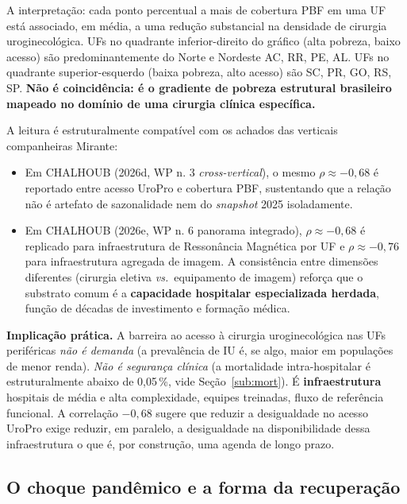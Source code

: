 \documentclass[12pt,a4paper,oneside]{article}
\begin{document}
A interpretação: cada ponto percentual a mais de cobertura PBF em
uma UF está associado, em média, a uma redução substancial na
densidade de cirurgia uroginecológica. UFs no quadrante inferior-direito
do gráfico (alta pobreza, baixo acesso) são predominantemente do
Norte e Nordeste \textemdash{} AC, RR, PE, AL. UFs no quadrante
superior-esquerdo (baixa pobreza, alto acesso) são SC, PR, GO, RS,
SP. \textbf{Não é coincidência: é o gradiente de pobreza estrutural
brasileiro mapeado no domínio de uma cirurgia clínica
específica.}

A leitura é estruturalmente compatível com os achados das verticais
companheiras Mirante:

\begin{itemize}
\item Em CHALHOUB (2026d, WP n. 3 \textendash{}
\textit{cross-vertical}), o mesmo $\rho \approx -0{,}68$ é
reportado entre acesso UroPro e cobertura PBF, sustentando que
a relação não é artefato de sazonalidade nem do
\textit{snapshot} 2025 isoladamente.
\item Em CHALHOUB (2026e, WP n. 6 \textendash{} panorama
integrado), $\rho \approx -0{,}68$ é replicado para
infraestrutura de Ressonância Magnética por UF e
$\rho \approx -0{,}76$ para infraestrutura agregada de imagem.
A consistência entre dimensões diferentes (cirurgia eletiva
\textit{vs.}\ equipamento de imagem) reforça que o substrato
comum é a \textbf{capacidade hospitalar especializada
herdada}, função de décadas de investimento e formação médica.
\end{itemize}

\textbf{Implicação prática.} A barreira ao acesso à cirurgia
uroginecológica nas UFs periféricas \textit{não é demanda} (a
prevalência de IU é, se algo, maior em populações de menor
renda). \textit{Não é segurança clínica} (a mortalidade
intra-hospitalar é estruturalmente abaixo de 0{,}05\,\%, vide
Seção~\ref{sub:mort}). É \textbf{infraestrutura}
\textemdash{} hospitais de média e alta complexidade, equipes
treinadas, fluxo de referência funcional. A correlação $-0{,}68$
sugere que reduzir a desigualdade no acesso UroPro exige reduzir,
em paralelo, a desigualdade na disponibilidade dessa infraestrutura
\textemdash{} o que é, por construção, uma agenda de longo prazo.

\subsection{O choque pandêmico e a forma da recuperação}\label{sub:covid}
\end{document}
